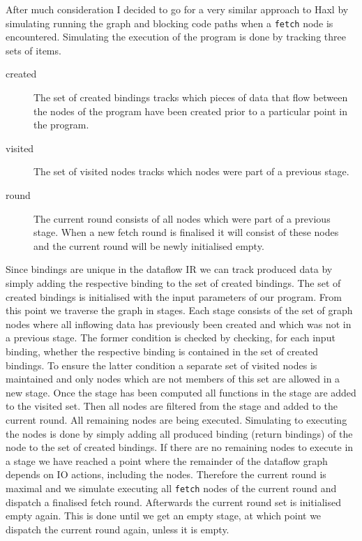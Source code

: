 After much consideration I decided to go for a very similar approach to Haxl by simulating running the graph and blocking code paths when a \texttt{fetch} node is encountered.
Simulating the execution of the program is done by tracking three sets of items.

\begin{description}
	\item[created] The set of created bindings tracks which pieces of data that flow between the nodes of the program have been created prior to a particular point in the program.
	\item[visited] The set of visited nodes tracks which nodes were part of a previous stage.
	\item[round] The current round consists of all \fetch{} nodes which were part of a previous stage.
	When a new fetch round is finalised it will consist of these \fetch{} nodes and the current round will be newly initialised empty.
\end{description}

Since bindings are unique in the dataflow IR we can track produced data by simply adding the respective binding to the set of created bindings.
The set of created bindings is initialised with the input parameters of our program.
From this point we traverse the graph in stages.
Each stage consists of the set of graph nodes where all inflowing data has previously been created and which was not in a previous stage.
The former condition is checked by checking, for each input binding, whether the respective binding is contained in the set of created bindings.
To ensure the latter condition a separate set of visited nodes is maintained and only nodes which are not members of this set are allowed in a new stage.
Once the stage has been computed all functions in the stage are added to the visited set.
Then all \fetch{} nodes are filtered from the stage and added to the current round.
All remaining nodes are being executed.
Simulating to executing the nodes is done by simply adding all produced binding (return bindings) of the node to the set of created bindings.
If there are no remaining nodes to execute in a stage we have reached a point where the remainder of the dataflow graph depends on IO actions, including the \fetch{} nodes.
Therefore the current round is maximal and we simulate executing all \texttt{fetch} nodes of the current round and dispatch a finalised fetch round.
Afterwards the current round set is initialised empty again.
This is done until we get an empty stage, at which point we dispatch the current round again, unless it is empty.


